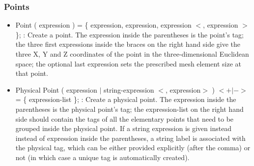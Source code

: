 \documentclass[dvipdfmx, 9pt, a4paper]{article}
\numberwithin{equation}{section}
\begin{document}
\subsubsection{Points}
\begin{itemize}
\item Point ( expression ) = \{ expression, expression, expression $<$, expression $>$ \}; : Create a point. The expression inside the parentheses is the point's tag; the three first expressions inside the braces on the right hand side give the three X, Y and Z coordinates of the point in the three-dimensional Euclidean space; the optional last expression sets the prescribed mesh element size at that point.
\item Physical Point ( expression $|$ string-expression $<$, expression$>$ ) $<+|->$= \{ expression-list \}; : Create a physical point. The expression inside the parentheses is the physical point's tag; the expression-list on the right hand side should contain the tags of all the
elementary points that need to be grouped inside the physical point. If a string expression is given instead instead of expression inside the parentheses, a string label is associated with the physical tag, which can be either provided explicitly (after the comma) or not (in which case a unique tag is automatically created).
\end{itemize}
\end{document}
